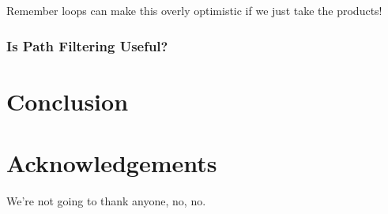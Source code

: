 \documentclass[letterpaper]{article}
\begin{document}
Remember loops can make this overly optimistic if we just take the products!

\subsubsection{Is Path Filtering Useful?}

\section{Conclusion}

\section*{Acknowledgements}

We're not going to thank anyone, no, no.



\end{document}

